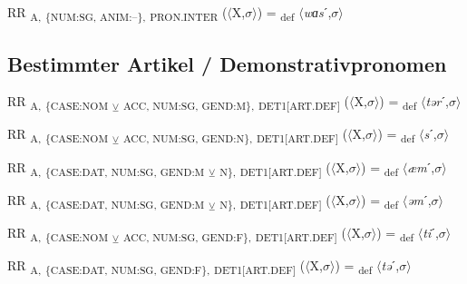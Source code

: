 {\begin{exe}
 RR \textsubscript{A,} \textsubscript{\{NUM:SG, ANIM:–\},} \textsubscript{PRON.INTER} ($\langle$X,$\sigma $$\rangle$) = \textsubscript{def} $\langle$\textit{wɑs}ˊ,$\sigma $$\rangle$
\end{exe}

\subsection{Bestimmter Artikel / Demonstrativpronomen}

\begin{exe}
 RR \textsubscript{A,} \textsubscript{\{CASE:NOM} \textsubscript{${\veebar}$}\textsubscript{ ACC, NUM:SG, GEND:M\},} \textsubscript{DET1[ART.DEF]} ($\langle$X,$\sigma $$\rangle$) = \textsubscript{def} $\langle$\textit{tər}ˊ,$\sigma $$\rangle$
\end{exe}

\begin{exe}
 RR \textsubscript{A,} \textsubscript{\{CASE:NOM} \textsubscript{${\veebar}$}\textsubscript{ ACC, NUM:SG, GEND:N\},} \textsubscript{DET1[ART.DEF]} ($\langle$X,$\sigma $$\rangle$) = \textsubscript{def} $\langle$\textit{s}ˊ,$\sigma $$\rangle$
\end{exe}

\begin{exe}
 RR \textsubscript{A,} \textsubscript{\{CASE:DAT, NUM:SG, GEND:M} \textsubscript{${\veebar}$}\textsubscript{ N\},} \textsubscript{DET1[ART.DEF]} ($\langle$X,$\sigma $$\rangle$) = \textsubscript{def} $\langle$\textit{æm}ˊ,$\sigma $$\rangle$
\end{exe}

\begin{exe}
 RR \textsubscript{A,} \textsubscript{\{CASE:DAT, NUM:SG, GEND:M} \textsubscript{${\veebar}$}\textsubscript{ N\},} \textsubscript{DET1[ART.DEF]} ($\langle$X,$\sigma $$\rangle$) = \textsubscript{def} $\langle$\textit{əm}ˊ,$\sigma $$\rangle$
\end{exe}

\begin{exe}
 RR \textsubscript{A,} \textsubscript{\{CASE:NOM} \textsubscript{${\veebar}$}\textsubscript{ ACC, NUM:SG, GEND:F\},} \textsubscript{DET1[ART.DEF]} ($\langle$X,$\sigma $$\rangle$) = \textsubscript{def} $\langle$\textit{ti}ˊ,$\sigma $$\rangle$
\end{exe}

\begin{exe}
 RR \textsubscript{A,} \textsubscript{\{CASE:DAT, NUM:SG, GEND:F\},} \textsubscript{DET1[ART.DEF]} ($\langle$X,$\sigma $$\rangle$) = \textsubscript{def} $\langle$\textit{tə}ˊ,$\sigma $$\rangle$
\end{exe}

}
